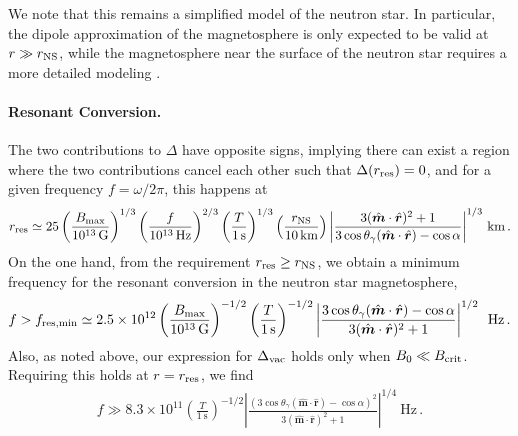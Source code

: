 \documentclass[a4paper,11pt]{article}
\begin{document}
We note that this remains a simplified model of the neutron star.
%
In particular,  the dipole approximation of the magnetosphere is only expected to be valid at $ r \gg r_{\rm NS} $, while the magnetosphere near the surface of the neutron star requires a more detailed modeling \cite{Melrose:2016kaf}.





\paragraph{Resonant Conversion.} The two  contributions to $ \Delta $ have opposite signs, implying there can exist a region where the two contributions cancel each other such that $ \Delta(r_{\rm res}) = 0 $, and for a given frequency $f =\omega/2\pi$, this happens at
%
\begin{align}
    r_{\rm res} \simeq 25 \left( \frac{B_{\rm max}}{10^{13} \, \text{G}} \right)^{1/3} \left( \frac{f }{10^{13} \, \text{Hz}} \right)^{2/3} \left( \frac{T}{1 \, \text{s}} \right)^{1/3} \left( \frac{r_{\rm NS}}{10\, \text{km}} \right)
    \left\vert \frac{ 3 ( \hat{\bm{m}} \cdot \hat{\bm{r}} )^{2} + 1  }{ 3 \cos\theta_{\gamma} (\hat{\bm{m}} \cdot \hat{\bm{r}}) - \cos \alpha } \right\vert^{1/3}
    \, \text{km} \, .
\end{align}
%
On the one hand, from the requirement $ r_{\rm res} \geq r_{\rm NS}$, we obtain a minimum frequency for the resonant conversion in the neutron star magnetosphere,
%
\begin{align}
    f  > f_{\rm res,min} \simeq 2.5 \times 10^{12}  \left( \frac{B_{\rm max}}{10^{13} \, \text{G}} \right)^{-1/2} \left( \frac{T}{1\,\text{s}} \right)^{-1/2} \left\vert \frac{ 3 \cos\theta_{\gamma} (\hat{\bm{m}} \cdot \hat{\bm{r}}) - \cos \alpha }{3 ( \hat{\bm{m}} \cdot \hat{\bm{r}} )^{2} + 1  } \right\vert^{1/2} \, \text{ Hz}   \, . \label{eq:f_min}
\end{align}
%
Also, as noted above, our expression for $ \Delta_{\rm vac} $ holds only when $ B_{0} \ll B_{\rm crit} $. Requiring this holds at $ r=r_{\rm res}$, we find
%
\begin{align}
    f \gg 8.3 \times 10^{11} \left( \frac{T}{1 ~ \text{s}} \right)^{-1/2} \left\vert \frac{ ( 3 \cos \theta_{\gamma} (\hat{\bm{m}} \cdot \hat{\bm{r}}) - \cos \alpha )^{2} }{3 ( \hat{\bm{m}} \cdot \hat{\bm{r}} )^{2} + 1  } \right\vert^{1/4} ~\text{Hz} \,.
\end{align}
\end{document}
